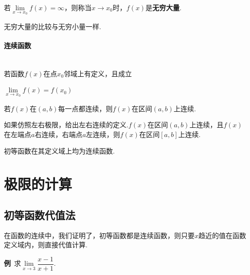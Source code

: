 \documentclass{ctexbook}
\begin{document}
	若$\lim\limits_{x \to x_0}f(x)=\infty$，则称当$x\to x_0$时，$f(x)$是\textbf{无穷大量}.
	
	无穷大量的比较与无穷小量一样.
	
	\paragraph{连续函数}~{}
	\\
	\indent
	若函数$f(x)$在点$x_0$邻域上有定义，且成立
	
	\centerline{$\lim\limits_{x \to x_0}f(x)=f(x_0)$}
	
	
	若$f(x)$在$(a,b)$每一点都连续，则$f(x)$在区间$(a,b)$上连续.
	
	如果仿照左右极限，给出左右连续的定义.$f(x)$在区间$(a,b)$上连续，且$f(x)$在左端点$a$右连续，右端点$a$左连续，则$f(x)$在区间$[a,b]$上连续.
	
	初等函数在其定义域上均为连续函数.
	
	\section{极限的计算}
	\subsection{初等函数代值法}
	在函数的连续中，我们证明了，初等函数都是连续函数，则只要$x$趋近的值在函数定义域内，则直接代值计算.
	
	\textbf{例}$\,\,\,$求$\lim\limits_{x \to 3}\dfrac{x-1}{x+1}$.
	
	
\end{document}
